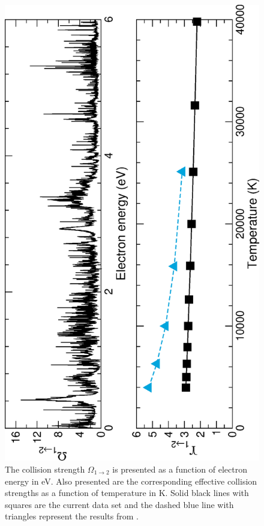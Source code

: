 %
\begin{figure}
\centering
\includegraphics[scale=0.75, angle=-90]{Figures/Cobalt/electron/trans1.eps}
\caption{The collision strength $\Omega_{1\rightarrow 2}$ is presented as a function of electron energy in eV. Also presented are the corresponding effective collision strengths as a function of temperature in K. Solid black lines with squares are the current data set and the dashed blue line with triangles represent the results from \citet{2016MNRAS.tmp..556S}. \label{fig:co_coll_infra1}}
\end{figure}
%

